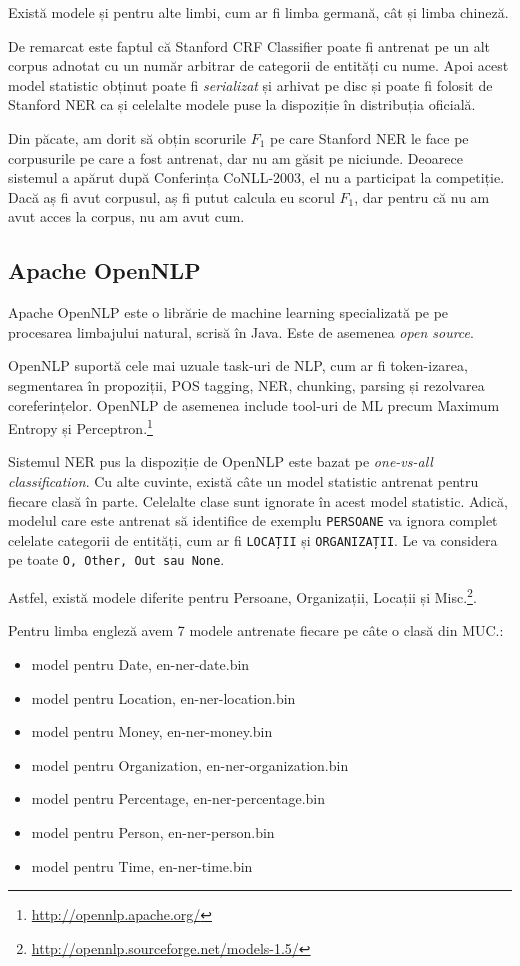 Există modele și pentru alte limbi, cum ar fi limba germană, cât și limba chineză.

De remarcat este faptul că Stanford CRF Classifier poate fi antrenat pe un alt corpus adnotat cu un număr arbitrar de categorii de entități cu nume. Apoi acest model statistic obținut poate fi \textit{serializat} și arhivat pe disc și poate fi folosit de Stanford NER ca și celelalte modele puse la dispoziție în distribuția oficială.

Din păcate, am dorit să obțin scorurile $F_1$ pe care Stanford NER le face pe corpusurile pe care a fost antrenat, dar nu am găsit pe niciunde. Deoarece sistemul a apărut după Conferința CoNLL-2003, el nu a participat la competiție. Dacă aș fi avut corpusul, aș fi putut calcula eu scorul $F_1$, dar pentru că nu am avut acces la corpus, nu am avut cum.


\subsection{Apache OpenNLP}

Apache OpenNLP este o librărie de machine learning specializată pe pe procesarea limbajului natural, scrisă în Java. Este de asemenea \textit{open source}.


OpenNLP suportă cele mai uzuale task-uri de NLP, cum ar fi token-izarea, segmentarea în propoziții, POS tagging, NER, chunking, parsing și rezolvarea coreferințelor. OpenNLP de asemenea include tool-uri de ML precum Maximum Entropy și Perceptron.\footnote{\url{http://opennlp.apache.org/}}


Sistemul NER pus la dispoziție de OpenNLP este bazat pe \textit{one-vs-all classification}. Cu alte cuvinte, există câte un model statistic antrenat pentru fiecare clasă în parte. Celelalte clase sunt ignorate în acest model statistic. Adică, modelul care este antrenat să identifice de exemplu \texttt{PERSOANE} va ignora complet celelate categorii de entități, cum ar fi \texttt{LOCAȚII} și \texttt{ORGANIZAȚII}. Le va considera pe toate \texttt{O, Other, Out sau None}.

Astfel, există modele diferite pentru Persoane, Organizații, Locații și Misc.\footnote{\url{http://opennlp.sourceforge.net/models-1.5/}}.

Pentru limba engleză avem 7 modele antrenate fiecare pe câte o clasă din MUC.:

\begin{itemize}
\item model pentru Date, en-ner-date.bin
\item model pentru Location, en-ner-location.bin
\item model pentru Money,	en-ner-money.bin
\item model pentru Organization,	en-ner-organization.bin
\item model pentru Percentage,	en-ner-percentage.bin
\item model pentru Person,	en-ner-person.bin
\item model pentru Time, en-ner-time.bin
\end{itemize}

